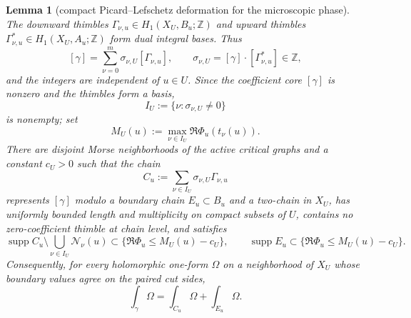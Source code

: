 \documentclass[reqno]{article}
\newtheorem{lem}[theorem]{Lemma}
\theoremstyle{definition}
\theoremstyle{remark}
\theoremstyle{plain}
\begin{document}
\begin{lem}[compact Picard--Lefschetz deformation for the microscopic phase]
The downward thimbles $\Gamma_{\nu,u}\in H_1(X_U,B_u;\mathbb Z)$ and upward thimbles $\Gamma^{\ast}_{\nu,u}\in H_1(X_U,A_u;\mathbb Z)$ form dual integral bases. Thus
\[
[\gamma]=\sum_{\nu=0}^m\sigma_{\nu,U}[\Gamma_{\nu,u}],
\qquad
\sigma_{\nu,U}=[\gamma]\cdot[\Gamma^{\ast}_{\nu,u}]\in\mathbb Z,
\]
and the integers are independent of $u\in U$. Since the coefficient core $[\gamma]$ is nonzero and the thimbles form a basis,
\[
I_U:=\{\nu:\sigma_{\nu,U}\ne0\}
\]
is nonempty; set
\[
M_U(u):=\max_{\nu\in I_U}\Re\Phi_u(t_\nu(u)).
\]
There are disjoint Morse neighborhoods of the active critical graphs and a constant $c_U>0$ such that the chain
\[
C_u:=\sum_{\nu\in I_U}\sigma_{\nu,U}\Gamma_{\nu,u}
\]
represents $[\gamma]$ modulo a boundary chain $E_u\subset B_u$ and a two-chain in $X_U$, has uniformly bounded length and multiplicity on compact subsets of $U$, contains no zero-coefficient thimble at chain level, and satisfies
\[
\operatorname{supp} C_u\setminus\bigcup_{\nu\in I_U}\mathcal N_\nu(u)
\subset\{\Re\Phi_u\le M_U(u)-c_U\},
\qquad
\operatorname{supp} E_u\subset\{\Re\Phi_u\le M_U(u)-c_U\}.
\]
Consequently, for every holomorphic one-form $\Omega$ on a neighborhood of $X_U$ whose boundary values agree on the paired cut sides,
\[
\int_\gamma\Omega=\int_{C_u}\Omega+\int_{E_u}\Omega .
\]
\end{lem}
\end{document}
